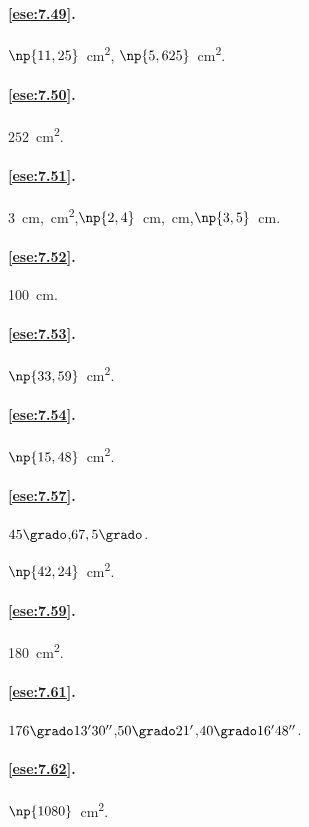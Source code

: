 \paragraph{\ref{ese:7.49}.}
\(\np{11,25}\)~cm\textsuperscript{2},\quad 
\(\np{5,625}\)~cm\textsuperscript{2}.

\paragraph{\ref{ese:7.50}.}
\(252\)~cm\textsuperscript{2}.

\paragraph{\ref{ese:7.51}.}
3~cm,~cm\textsuperscript{2},\quad \(\np{2,4}\)~cm,~cm,\quad \(\np{3,5}\)~cm.

\paragraph{\ref{ese:7.52}.}
100~cm.

\paragraph{\ref{ese:7.53}.}
\(\np{33,59}\)~cm\textsuperscript{2}.

\paragraph{\ref{ese:7.54}.}
\(\np{15,48}\)~cm\textsuperscript{2}.

\paragraph{\ref{ese:7.57}.}
\(45\grado\),\quad \(67,5\grado\).

\(\np{42,24}\)~cm\textsuperscript{2}.

\paragraph{\ref{ese:7.59}.}
180~cm\textsuperscript{2}.

\paragraph{\ref{ese:7.61}.}
\(176\grado13'30''\),\quad \(50\grado21'\),\quad \(40\grado16'48''\).

\paragraph{\ref{ese:7.62}.}
\(\np{1080}\)~cm\textsuperscript{2}.

